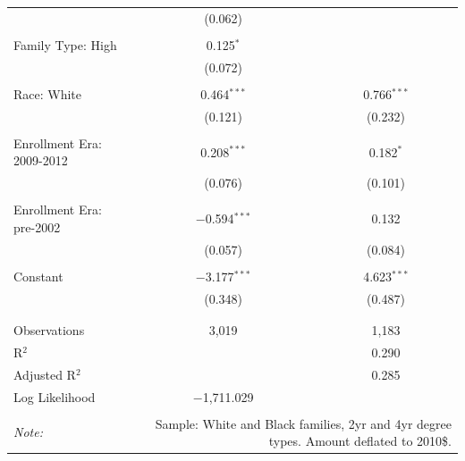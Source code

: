 \begin{table}[!htbp]
\begin{tabular}{@{\extracolsep{5pt}}lcc}
  & (0.062) &  \\ 
  & & \\ 
 Family Type: High & 0.125$^{*}$ &  \\ 
  & (0.072) &  \\ 
  & & \\ 
 Race: White & 0.464$^{***}$ & 0.766$^{***}$ \\ 
  & (0.121) & (0.232) \\ 
  & & \\ 
 Enrollment Era: 2009-2012 & 0.208$^{***}$ & 0.182$^{*}$ \\ 
  & (0.076) & (0.101) \\ 
  & & \\ 
 Enrollment Era: pre-2002 & $-$0.594$^{***}$ & 0.132 \\ 
  & (0.057) & (0.084) \\ 
  & & \\ 
 Constant & $-$3.177$^{***}$ & 4.623$^{***}$ \\ 
  & (0.348) & (0.487) \\ 
  & & \\ 
\hline \\[-1.8ex] 
Observations & 3,019 & 1,183 \\ 
R$^{2}$ &  & 0.290 \\ 
Adjusted R$^{2}$ &  & 0.285 \\ 
Log Likelihood & $-$1,711.029 &  \\ 
\hline 
\hline \\[-1.8ex] 
\textit{Note:}  & \multicolumn{2}{r}{Sample: White and Black families, 2yr and 4yr degree types. Amount deflated to 2010\$.} \\ 
\end{tabular} 
\end{table} 
